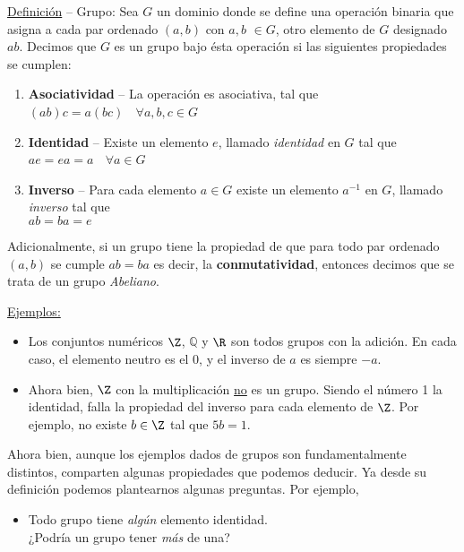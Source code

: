 \documentclass[../main.tex]{subfiles}
\begin{document}
{{        \clearpage
        \ul{Definición} -- Grupo:
        Sea $G$ un dominio donde se define una operación binaria que asigna a cada par ordenado $(a,b)$ con $a,b$ $\in G$, otro elemento de $G$ designado $ab$. Decimos que $G$ es un grupo bajo ésta operación si las siguientes propiedades se cumplen:
        
        \begin{enumerate}
            \item { \textbf{Asociatividad} -- La operación es asociativa, tal que
            \\ $(ab)c = a(bc)$ $\;$ $\forall a,b,c \in G$}
            \item { \textbf{Identidad} -- Existe un elemento $e$, llamado \textit{identidad} en $G$ tal que 
            \\ $ae = ea = a$ $\;$ $\forall a \in G$}
            \item \textbf{Inverso} -- Para cada elemento $a \in G$ existe un elemento $a^{-1}$ en $G$, llamado \textit{inverso} tal que
            \\ $ab = ba = e$
        \end{enumerate}
        
        Adicionalmente, si un grupo tiene la propiedad de que para todo par ordenado $(a,b)$ se cumple $ab = ba$ es decir, la \textbf{conmutatividad}, entonces decimos que se trata de un
        grupo \textit{Abeliano}.
        
        \nln
        \ul{Ejemplos:}
        \begin{itemize}
            \item Los conjuntos numéricos $\Z$, $\mathbb{Q}$ y $\R$ son todos grupos con la adición. En cada caso, el elemento neutro es el 0, y el inverso de $a$ es siempre $-a$.
            
            \item Ahora bien, $\Z$ con la multiplicación \ul{no} es un grupo. Siendo el número 1 la identidad, falla la propiedad del inverso para cada elemento de $\Z$. Por ejemplo, no existe $b \in \Z$ tal que $5b = 1$.
        \end{itemize}
        
        Ahora bien, aunque los ejemplos dados de grupos son fundamentalmente distintos, comparten algunas propiedades que podemos deducir. Ya desde su definición podemos plantearnos algunas preguntas. Por ejemplo,
        
        \begin{itemize}
            \item Todo grupo tiene \textit{algún} elemento identidad. 
            \\ ¿Podría un grupo tener \textit{más} de una?
            

\end{itemize}}}
\end{document}
